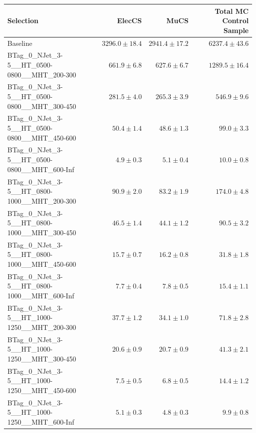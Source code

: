 \documentclass{beamer}
\begin{document}
\begin{frame}
\begin{tabular}{lrrr}
                                                Selection  &                   ElecCS  &                     MuCS  &          Total MC Control Sample  \\ 
\midrule
                                             Baseline &           $3296.0\pm18.4$&           $2941.4\pm17.2$&               $6237.4\pm43.6$ \\ 
      BTag\_0\_NJet\_3-5\_\_HT\_0500-0800\_\_MHT\_200-300 &             $661.9\pm6.8$&             $627.6\pm6.7$&               $1289.5\pm16.4$ \\ 
      BTag\_0\_NJet\_3-5\_\_HT\_0500-0800\_\_MHT\_300-450 &             $281.5\pm4.0$&             $265.3\pm3.9$&                 $546.9\pm9.6$ \\ 
      BTag\_0\_NJet\_3-5\_\_HT\_0500-0800\_\_MHT\_450-600 &              $50.4\pm1.4$&              $48.6\pm1.3$&                  $99.0\pm3.3$ \\ 
      BTag\_0\_NJet\_3-5\_\_HT\_0500-0800\_\_MHT\_600-Inf &               $4.9\pm0.3$&               $5.1\pm0.4$&                  $10.0\pm0.8$ \\ 
      BTag\_0\_NJet\_3-5\_\_HT\_0800-1000\_\_MHT\_200-300 &              $90.9\pm2.0$&              $83.2\pm1.9$&                 $174.0\pm4.8$ \\ 
      BTag\_0\_NJet\_3-5\_\_HT\_0800-1000\_\_MHT\_300-450 &              $46.5\pm1.4$&              $44.1\pm1.2$&                  $90.5\pm3.2$ \\ 
      BTag\_0\_NJet\_3-5\_\_HT\_0800-1000\_\_MHT\_450-600 &              $15.7\pm0.7$&              $16.2\pm0.8$&                  $31.8\pm1.8$ \\ 
      BTag\_0\_NJet\_3-5\_\_HT\_0800-1000\_\_MHT\_600-Inf &               $7.7\pm0.4$&               $7.8\pm0.5$&                  $15.4\pm1.1$ \\ 
      BTag\_0\_NJet\_3-5\_\_HT\_1000-1250\_\_MHT\_200-300 &              $37.7\pm1.2$&              $34.1\pm1.0$&                  $71.8\pm2.8$ \\ 
      BTag\_0\_NJet\_3-5\_\_HT\_1000-1250\_\_MHT\_300-450 &              $20.6\pm0.9$&              $20.7\pm0.9$&                  $41.3\pm2.1$ \\ 
      BTag\_0\_NJet\_3-5\_\_HT\_1000-1250\_\_MHT\_450-600 &               $7.5\pm0.5$&               $6.8\pm0.5$&                  $14.4\pm1.2$ \\ 
      BTag\_0\_NJet\_3-5\_\_HT\_1000-1250\_\_MHT\_600-Inf &               $5.1\pm0.3$&               $4.8\pm0.3$&                   $9.9\pm0.8$ \\ 

\end{tabular}
\end{frame}
\end{document}
